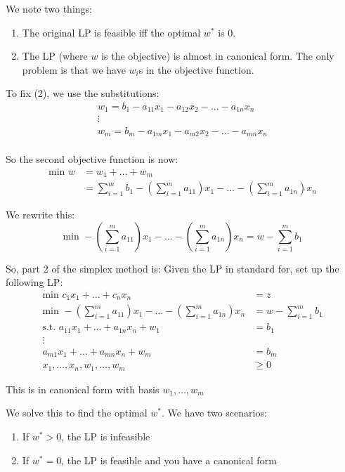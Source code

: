 \documentclass{article}
\begin{document}
We note two things: \\
\begin{enumerate}
    \item The original LP is feasible iff the optimal \(w^*\) is 0.
    \item The LP (where \(w\) is the objective) is almost in canonical form. The only 
    problem is that we have \(w_i\)s in the objective function. 
\end{enumerate}

To fix (2), we use the substitutions:
\begin{align}
    w_1=b_1-a_{11}x_1-a_{12}x_2-\dots-a_{1n}x_n \\
    \vdots \\
    w_m=b_m-a_{1m}x_1-a_{m2}x_2-\dots-a_{mn}x_n \\
\end{align}

So the second objective function is now: \\
\begin{align}
    \text{min }w&=w_1+\dots+w_m \\
    &= \sum_{i=1}^m b_1-(\sum_{i=1}^m a_{11})x_1-\dots -(\sum_{i=1}^m a_{1n})x_n
\end{align}

We rewrite this: \\
\[
    \text{min }-(\sum_{i=1}^m a_{11})x_1-\dots -(\sum_{i=1}^m a_{1n})x_n=w-\sum_{i=1}^m b_1
\]

So, part 2 of the simplex method is: Given the LP in standard for, set up the following 
LP: \\
\begin{align}
    \text{min }c_1x_1+\dots+c_n x_n &=z \\
    \text{min }-(\sum_{i=1}^m a_{11})x_1-\dots -(\sum_{i=1}^m a_{1n})x_n &=w-\sum_{i=1}^m b_1 \\
    \text{s.t. }a_{11}x_1+\dots+a_{1n}x_n+w_1&=b_1 \\
    \vdots \\
    a_{m1}x_1+\dots+a_{mn}x_n+w_m&=b_m \\
    x_{1},\dots,x_ n, w_1, \dots, w_m & \geq0
\end{align}

This is in canonical form with basis \(w_1,\dots,w_m\)

We solve this to find the optimal \(w^*\). We have two scenarios: \\
\begin{enumerate}
    \item If \(w^*>0\), the LP is infeasible \\
    \item If \(w^*=0\), the LP is feasible and you have a canonical form 
\end{enumerate} 
\end{document}
